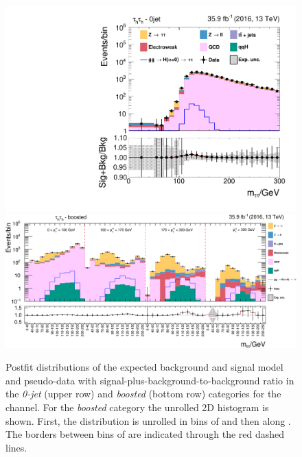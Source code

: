 \begin{figure}[h!]
    \centering
        \includegraphics[width=.5\textwidth]{Figures/statana/Postfit_JEC_mela3D/postfit_fit_s_htt_tt_1_13TeV.pdf}
        \includegraphics[width=\textwidth]{Figures/statana/Postfit_JEC_mela3D/postfit_fit_s_htt_tt_2_13TeV-crop.pdf}
    \caption[Unrolled postfit distributions in the \textit{0-jet} and \textit{boosted} category in the \tautau{} channel.]{Postfit distributions of the expected background and signal model and pseudo-data with signal-plus-background-to-background ratio in the \textit{0-jet} (upper row) and \textit{boosted} (bottom row) categories for the \tautau{} channel.
    For the \textit{boosted} category the unrolled 2D histogram is shown. First, the distribution is unrolled in bins of \ptautau{} and then along \msv. The 
        borders between bins of \ptautau are indicated through the red dashed lines.}\label{SA:tt_postfit_0jet_1jet}
\end{figure}%


